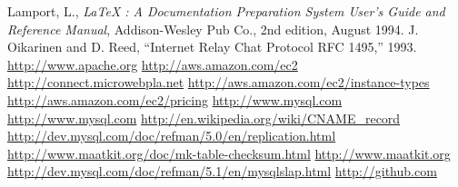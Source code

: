 \documentclass[12pt]{article}
\begin{document}
\begin{thebibliography}{99}
 Lamport, L., {\it LaTeX : A Documentation
 Preparation System User's Guide and Reference Manual}, Addison-Wesley
 Pub Co., 2nd edition, August 1994.
 J. Oikarinen and D. Reed, “Internet Relay Chat Protocol
RFC 1495,” 1993.
 \url{http://www.apache.org}
  \url{http://aws.amazon.com/ec2}
  \url{http://connect.microwebpla.net}
 \url{http://aws.amazon.com/ec2/instance-types}
\url{http://aws.amazon.com/ec2/pricing}
 \url{http://www.mysql.com}
 \url{http://www.mysql.com}
 \url{http://en.wikipedia.org/wiki/CNAME\_record}
 \url{http://dev.mysql.com/doc/refman/5.0/en/replication.html}
 \url{http://www.maatkit.org/doc/mk-table-checksum.html}
 \url{http://www.maatkit.org}
 \url{http://dev.mysql.com/doc/refman/5.1/en/mysqlslap.html}
 \url{http://github.com}
\end{thebibliography}
\end{document}

